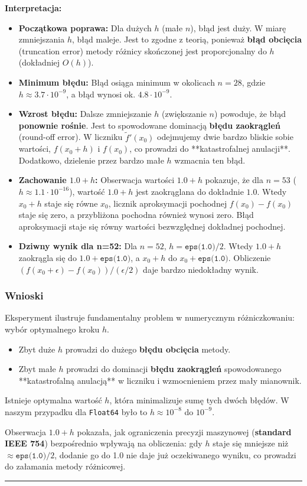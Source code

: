 \documentclass[11pt, a4paper]{article}
\newcommand{\taskseparator}{\leavevmode\leaders\hrule height 0.5pt\hfill\kern0pt}
\begin{document}
\noindent \textbf{Interpretacja:}
\begin{itemize}
    \item \textbf{Początkowa poprawa:} Dla dużych $h$ (małe $n$), błąd jest duży. W miarę zmniejszania $h$, błąd maleje. Jest to zgodne z teorią, ponieważ \textbf{błąd obcięcia} (truncation error) metody różnicy skończonej jest proporcjonalny do $h$ (dokładniej $O(h)$).
    \item \textbf{Minimum błędu:} Błąd osiąga minimum w okolicach $n=28$, gdzie $h \approx 3.7 \cdot 10^{-9}$, a błąd wynosi ok. $4.8 \cdot 10^{-9}$.
    \item \textbf{Wzrost błędu:} Dalsze zmniejszanie $h$ (zwiększanie $n$) powoduje, że błąd \textbf{ponownie rośnie}. Jest to spowodowane dominacją \textbf{błędu zaokrągleń} (round-off error). W liczniku $\tilde{f}'(x_0)$ odejmujemy dwie bardzo bliskie sobie wartości, $f(x_0+h)$ i $f(x_0)$, co prowadzi do **katastrofalnej anulacji**. Dodatkowo, dzielenie przez bardzo małe $h$ wzmacnia ten błąd.
    \item \textbf{Zachowanie $1.0 + h$:} Obserwacja wartości $1.0 + h$ pokazuje, że dla $n=53$ ($h \approx 1.1 \cdot 10^{-16}$), wartość $1.0 + h$ jest zaokrąglana do dokładnie $1.0$. Wtedy $x_0 + h$ staje się równe $x_0$, licznik aproksymacji pochodnej $f(x_0) - f(x_0)$ staje się zero, a przybliżona pochodna również wynosi zero. Błąd aproksymacji staje się równy wartości bezwzględnej dokładnej pochodnej.
    \item \textbf{Dziwny wynik dla n=52:} Dla $n=52$, $h = \texttt{eps(1.0)} / 2$. Wtedy $1.0 + h$ zaokrągla się do $1.0 + \texttt{eps(1.0)}$, a $x_0+h$ do $x_0 + \texttt{eps(1.0)}$. Obliczenie $(f(x_0+\epsilon) - f(x_0)) / (\epsilon/2)$ daje bardzo niedokładny wynik.
\end{itemize}

\subsubsection{Wnioski}
Eksperyment ilustruje fundamentalny problem w numerycznym różniczkowaniu: wybór optymalnego kroku $h$.
\begin{itemize}
    \item Zbyt duże $h$ prowadzi do dużego \textbf{błędu obcięcia} metody.
    \item Zbyt małe $h$ prowadzi do dominacji \textbf{błędu zaokrągleń} spowodowanego **katastrofalną anulacją** w liczniku i wzmocnieniem przez mały mianownik.
\end{itemize}
Istnieje optymalna wartość $h$, która minimalizuje sumę tych dwóch błędów. W naszym przypadku dla \texttt{Float64} było to $h \approx 10^{-8}$ do $10^{-9}$.

Obserwacja $1.0 + h$ pokazała, jak ograniczenia precyzji maszynowej (\textbf{standard IEEE 754}) bezpośrednio wpływają na obliczenia: gdy $h$ staje się mniejsze niż $\approx \texttt{eps(1.0)}/2$, dodanie go do 1.0 nie daje już oczekiwanego wyniku, co prowadzi do załamania metody różnicowej.

\taskseparator
\end{document}
